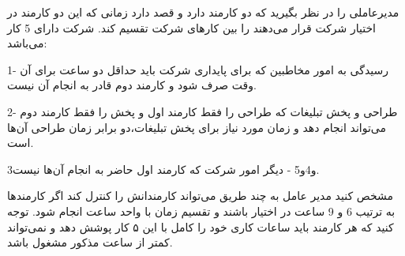 \documentclass[12pt,onecolumn,a4paper]{article}
\begin{document}
مدیرعاملی را در نظر بگیرید که دو کارمند دارد و قصد دارد زمانی که این دو کارمند در اختیار شرکت قرار می‌دهند را بین کار‌های شرکت تقسیم کند. شرکت دارای 5 کار می‌باشد:

1- رسیدگی به امور مخاطبین که برای پایداری شرکت باید حداقل دو ساعت برای آن وقت صرف شود و کارمند دوم قادر به انجام آن نیست.

2- طراحی و پخش تبلیغات که طراحی را فقط کارمند اول و پخش را فقط کارمند دوم می‌تواند انجام دهد و زمان مورد نیاز برای پخش تبلیغات،دو برابر زمان طراحی آن‌ها است.

3و4و5 - دیگر امور شرکت که کارمند اول حاضر به انجام آن‌ها نیست.

مشخص کنید مدیر عامل به چند طریق می‌تواند کارمندانش را کنترل کند اگر کارمند‌ها به ترتیب 6 و 9 ساعت در اختیار باشند و تقسیم زمان با واحد ساعت انجام شود.
توجه کنید که هر کارمند باید ساعات کاری خود را کامل با این ۵ کار پوشش دهد و نمی‌تواند کمتر از ساعت مذکور مشغول باشد.
\end{document}
